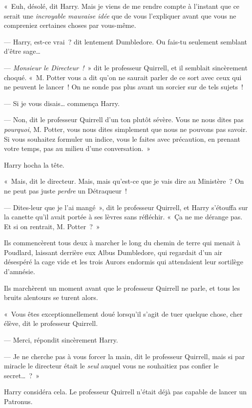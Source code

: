 «~Euh, désolé, dit Harry. Mais je viens de me rendre compte à l'instant que ce serait une \emph{incroyable mauvaise idée} que de vous l'expliquer avant que vous ne compreniez certaines choses par vous-même.

--- Harry, est-ce vrai~? dit lentement Dumbledore. Ou fais-tu seulement semblant d'être sage…

--- \emph{Monsieur le Directeur~!}~» dit le professeur Quirrell, et il semblait sincèrement choqué. «~M. Potter vous a dit qu'on ne saurait parler de ce sort avec ceux qui ne peuvent le lancer~! On ne sonde pas plus avant un sorcier sur de tels sujets~!

--- Si je vous disais… commença Harry.

--- Non, dit le professeur Quirrell d'un ton plutôt sévère. Vous ne nous dites pas \emph{pourquoi}, M. Potter, vous nous dites simplement que nous ne pouvons pas savoir. Si vous souhaitez formuler un indice, vous le faites avec précaution, en prenant votre temps, pas au milieu d'une conversation.~»

Harry hocha la tête.

«~Mais, dit le directeur. Mais, mais qu'est-ce que je vais dire au Ministère~? On ne peut pas juste \emph{perdre} un Détraqueur~!

--- Dites-leur que je l'ai mangé~», dit le professeur Quirrell, et Harry s'étouffa sur la canette qu'il avait portée à ses lèvres sans réfléchir. «~Ça ne me dérange pas. Et si on rentrait, M. Potter~?~»

Ils commencèrent tous deux à marcher le long du chemin de terre qui menait à Poudlard, laissant derrière eux Albus Dumbledore, qui regardait d'un air désespéré la cage vide et les trois Aurors endormis qui attendaient leur sortilège d'amnésie.


Ils marchèrent un moment avant que le professeur Quirrell ne parle, et tous les bruits alentours se turent alors.

«~Vous êtes exceptionnellement doué lorsqu'il s'agit de tuer quelque chose, cher élève, dit le professeur Quirrell.

--- Merci, répondit sincèrement Harry.

--- Je ne cherche pas à vous forcer la main, dit le professeur Quirrell, mais si par miracle le directeur était le \emph{seul} auquel vous ne souhaitiez pas confier le secret…~?~»

Harry considéra cela. Le professeur Quirrell n'était déjà pas capable de lancer un Patronus.

